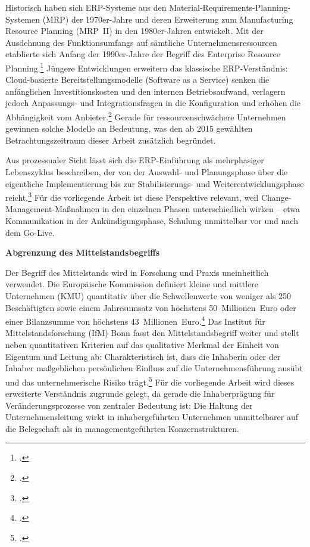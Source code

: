 Historisch haben sich ERP-Systeme aus den Material-Requirements-Planning-Systemen (MRP) der 1970er-Jahre und deren Erweiterung zum Manufacturing Resource Planning (MRP~II) in den 1980er-Jahren entwickelt. Mit der Ausdehnung des Funktionsumfangs auf s\"amtliche Unternehmensressourcen etablierte sich Anfang der 1990er-Jahre der Begriff des Enterprise Resource Planning.\footcite[Vgl.][S.~143--146]{klaus2000} J\"ungere Entwicklungen erweitern das klassische ERP-Verst\"andnis: Cloud-basierte Bereitstellungsmodelle (Software as a Service) senken die anf\"anglichen Investitionskosten und den internen Betriebsaufwand, verlagern jedoch Anpassungs- und Integrationsfragen in die Konfiguration und erh\"ohen die Abh\"angigkeit vom Anbieter.\footcite[Vgl.][S.~3--4]{butarbutar2023} Gerade f\"ur ressourcenschw\"achere Unternehmen gewinnen solche Modelle an Bedeutung, was den ab 2015 gew\"ahlten Betrachtungszeitraum dieser Arbeit zus\"atzlich begr\"undet.

Aus prozessualer Sicht l\"asst sich die ERP-Einf\"uhrung als mehrphasiger Lebenszyklus beschreiben, der von der Auswahl- und Planungsphase \"uber die eigentliche Implementierung bis zur Stabilisierungs- und Weiterentwicklungsphase reicht.\footcite[Vgl.][S.~189--194]{markus2000} F\"ur die vorliegende Arbeit ist diese Perspektive relevant, weil Change-Management-Ma\ss{}nahmen in den einzelnen Phasen unterschiedlich wirken -- etwa Kommunikation in der Ank\"undigungsphase, Schulung unmittelbar vor und nach dem Go-Live.

\textbf{Abgrenzung des Mittelstandsbegriffs}

Der Begriff des Mittelstands wird in Forschung und Praxis uneinheitlich verwendet. Die Europ\"aische Kommission definiert kleine und mittlere Unternehmen (KMU) quantitativ \"uber die Schwellenwerte von weniger als 250 Besch\"aftigten sowie einem Jahresumsatz von h\"ochstens 50~Millionen~Euro oder einer Bilanzsumme von h\"ochstens 43~Millionen~Euro.\footcite[Vgl.]{eu_kommission2003} Das Institut f\"ur Mittelstandsforschung (IfM) Bonn fasst den Mittelstandsbegriff weiter und stellt neben quantitativen Kriterien auf das qualitative Merkmal der Einheit von Eigentum und Leitung ab: Charakteristisch ist, dass die Inhaberin oder der Inhaber ma\ss{}geblichen pers\"onlichen Einfluss auf die Unternehmensf\"uhrung aus\"ubt und das unternehmerische Risiko tr\"agt.\footcite[Vgl.]{ifm_bonn} F\"ur die vorliegende Arbeit wird dieses erweiterte Verst\"andnis zugrunde gelegt, da gerade die Inhaberpr\"agung f\"ur Ver\"anderungsprozesse von zentraler Bedeutung ist: Die Haltung der Unternehmensleitung wirkt in inhabergef\"uhrten Unternehmen unmittelbarer auf die Belegschaft als in managementgef\"uhrten Konzernstrukturen.

